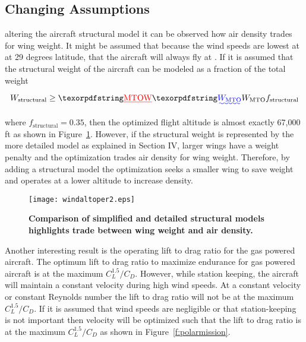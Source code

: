 \subsection{Changing \DIFaddbegin {}\DIFaddend Assumptions}

\DIFdelbegin {}\DIFdelend \DIFaddbegin {}\DIFaddend altering the aircraft structural model it can be observed how air density trades for wing weight. 
It might be assumed that because the wind speeds are lowest at \DIFdelbegin {}\DIFdelend \DIFaddbegin {}\DIFaddend at 29 degrees latitude, that the aircraft will always fly at \DIFdelbegin {}\DIFdelend \DIFaddbegin {}\DIFaddend .  
If it is assumed that the structural weight of the aircraft can be modeled as a fraction of the total weight 

\begin{equation}
    W_{\text{structural}} \geq \DIFdelbegin \DIFdel{\text{MTOW} }\DIFdelend \DIFaddbegin \DIFadd{W_{\text{MTO}} }\DIFaddend f_{\text{structural}}
\end{equation}

where $f_{\text{structural}} = 0.35$, then the optimized flight altitude is almost exactly 67,000 ft as shown in Figure~\ref{f:altoper}.  
However, if the structural weight is represented by the more detailed model as explained in Section IV, larger wings have a weight penalty and the optimization trades air density for wing weight.
Therefore, by adding a structural model the optimization seeks a smaller wing to save weight and operates at a lower altitude to increase density. 

\begin{figure}[H]
	\begin{center}
	\DIFdelbeginFL %
\DIFdelendFL \DIFaddbeginFL \texttt{[image: windaltoper2.eps]}
 \DIFaddendFL \caption{\textbf{Comparison of simplified and detailed structural models highlights trade between wing weight and air density.}}
 \label{f:altoper}
	\end{center}
\end{figure}

Another interesting result is the operating lift to drag ratio for the gas powered aircraft.  
The optimum lift to drag ratio to maximize endurance for gas powered aircraft is at the maximum $C_L^{1.5}/C_D$.\cite{br2}  
However, while station keeping, the aircraft will maintain a constant velocity during high wind speeds.  
At a constant velocity or constant Reynolds number the lift to drag ratio will not be at the maximum $C_L^{1.5}/C_D$.  
If it is assumed that wind speeds are negligible or that station-keeping is not important then velocity will be optimized such that the lift to drag ratio is at the maximum $C_L^{1.5}/C_D$ as shown in Figure~\ref{f:polarmission}.

